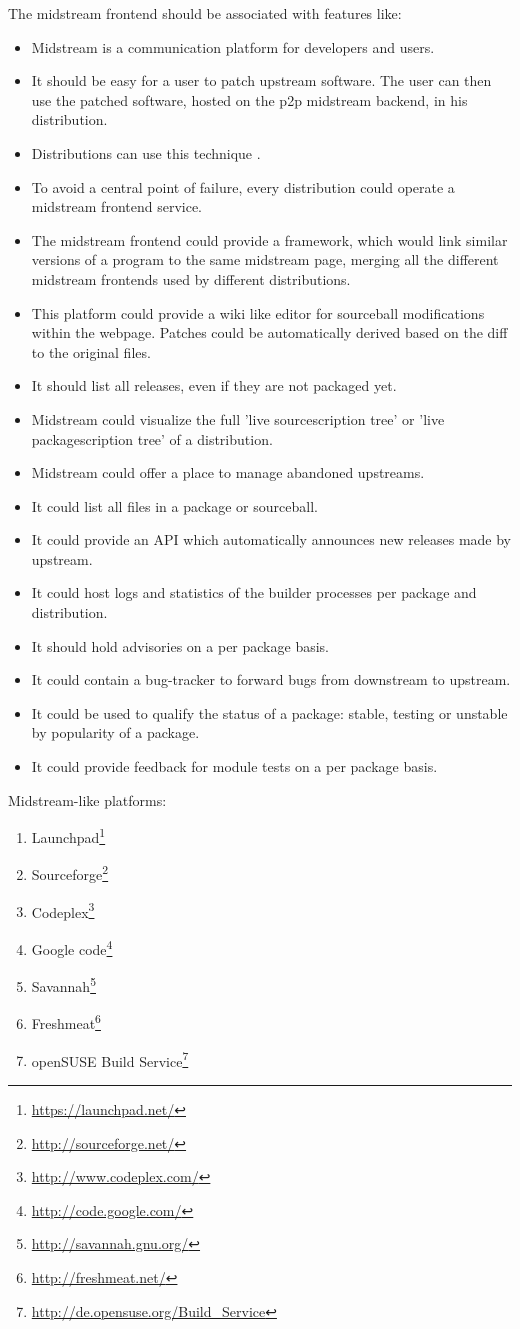 \documentclass[a4paper,10pt]{article}
\begin{document}
The midstream frontend should be associated with features like:
\begin{itemize}
\item Midstream is a communication platform for developers and users.
\item It should be easy for a user to patch upstream software. The user can then use the patched software, hosted on the p2p midstream backend, in his distribution.
\item Distributions can use this technique .
\item To avoid a central point of failure, every distribution could operate a midstream frontend service.
\item The midstream frontend could provide a framework, which would link similar versions of a program to the same midstream page, merging all the different midstream frontends used by different distributions.
\item This platform could provide a wiki like editor for sourceball modifications within the webpage. Patches could be automatically derived based on the diff to the original files.
\item It should list all releases, even if they are not packaged yet.
\item Midstream could visualize the full 'live sourcescription tree' or 'live packagescription tree' of a distribution.
\item Midstream could offer a place to manage abandoned upstreams.
\item It could list all files in a package or sourceball.
\item It could provide an API which automatically announces new releases made by upstream.
\item It could host logs and statistics of the builder processes per package and distribution.
\item It should hold advisories on a per package basis.
\item It could contain a bug-tracker to forward bugs from downstream to upstream.
\item It could be used to qualify the status of a package: stable, testing or unstable by popularity of a package.
\item It could provide feedback for module tests on a per package basis. 
\end{itemize}


Midstream-like platforms:
\begin{enumerate}
\item Launchpad\footnote{\url{https://launchpad.net/}}
\item Sourceforge\footnote{\url{http://sourceforge.net/}}
\item Codeplex\footnote{\url{http://www.codeplex.com/}}
\item Google code\footnote{\url{http://code.google.com/}}
\item Savannah\footnote{\url{http://savannah.gnu.org/}}
\item Freshmeat\footnote{\url{http://freshmeat.net/}}
\item openSUSE Build Service\footnote{\url{http://de.opensuse.org/Build_Service}}
\end{enumerate}
\end{document}
